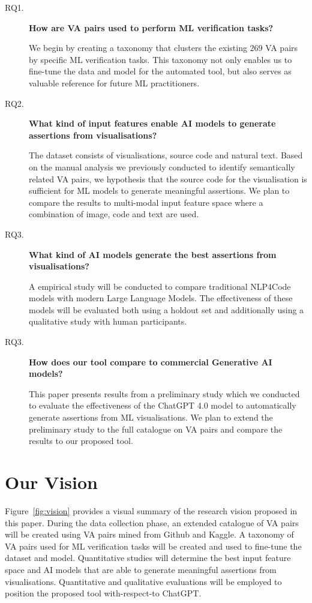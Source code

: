 \documentclass[sigconf]{acmart}
\begin{document}
\begin{description}
  \item[RQ1.] \textbf{How are VA pairs used to perform ML verification
    tasks?}

    We begin by creating a taxonomy that clusters the existing $269$
    VA pairs by specific ML verification tasks. This taxonomy not only
    enables us to fine-tune the data and model for the automated tool,
    but also serves as valuable reference for future ML practitioners.

  \item[RQ2.] \textbf{What kind of input features enable AI models to
    generate assertions from visualisations?}

    The dataset consists of visualisations, source code and natural
    text. Based on the manual analysis we previously conducted to
    identify semantically related VA pairs, we hypothesis that the
    source code for the visualisation is sufficient for ML models to
    generate meaningful assertions. We plan to compare the results to
    multi-modal input feature space where a combination of image, code
    and text are used.

  \item[RQ3.] \textbf{What kind of AI models generate the best
    assertions from visualisations?}

    A empirical study will be conducted to compare traditional
    NLP4Code models with modern Large Language Models. The
    effectiveness of these models will be evaluated both using
    a holdout set and additionally using a qualitative study with
    human participants.

  \item[RQ3.] \textbf{How does our tool compare to commercial
    Generative AI models?}

    This paper presents results from a preliminary study which we
    conducted to evaluate the effectiveness of the ChatGPT 4.0 model
    to automatically generate assertions from ML visualisations. We
    plan to extend the preliminary study to the full catalogue on VA
    pairs and compare the results to our proposed tool.

\end{description}

\section{Our Vision}

Figure~\ref{fig:vision} provides a visual summary of the research
vision proposed in this paper. During the data collection phase, an
extended catalogue of VA pairs will be created using VA pairs mined
from Github and Kaggle. A taxonomy of VA pairs used for ML
verification tasks will be created and used to fine-tune the dataset
and model. Quantitative studies will determine the best input feature
space and AI models that are able to generate meaningful assertions
from visualisations. Quantitative and qualitative evaluations will be
employed to position the proposed tool with-respect-to ChatGPT.
\end{document}
